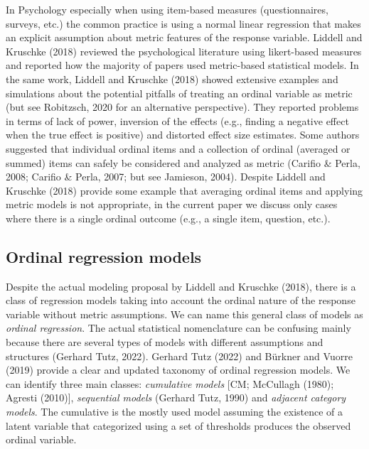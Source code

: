 \documentclass[
  man,floatsintext]{apa6}
\begin{document}
In Psychology especially when using item-based measures (questionnaires, surveys, etc.) the common practice is using a normal linear regression that makes an explicit assumption about metric features of the response variable. Liddell and Kruschke (2018) reviewed the psychological literature using likert-based measures and reported how the majority of papers used metric-based statistical models. In the same work, Liddell and Kruschke (2018) showed extensive examples and simulations about the potential pitfalls of treating an ordinal variable as metric (but see Robitzsch, 2020 for an alternative perspective). They reported problems in terms of lack of power, inversion of the effects (e.g., finding a negative effect when the true effect is positive) and distorted effect size estimates. Some authors suggested that individual ordinal items and a collection of ordinal (averaged or summed) items can safely be considered and analyzed as metric (Carifio \& Perla, 2008; Carifio \& Perla, 2007; but see Jamieson, 2004). Despite Liddell and Kruschke (2018) provide some example that averaging ordinal items and applying metric models is not appropriate, in the current paper we discuss only cases where there is a single ordinal outcome (e.g., a single item, question, etc.).

\subsection{Ordinal regression models}\label{ordinal-regression-models}

Despite the actual modeling proposal by Liddell and Kruschke (2018), there is a class of regression models taking into account the ordinal nature of the response variable without metric assumptions. We can name this general class of models as \emph{ordinal regression}. The actual statistical nomenclature can be confusing mainly because there are several types of models with different assumptions and structures (Gerhard Tutz, 2022). Gerhard Tutz (2022) and Bürkner and Vuorre (2019) provide a clear and updated taxonomy of ordinal regression models. We can identify three main classes: \emph{cumulative models} {[}CM; McCullagh (1980); Agresti (2010){]}, \emph{sequential models} (Gerhard Tutz, 1990) and \emph{adjacent category models}. The cumulative is the mostly used model assuming the existence of a latent variable that categorized using a set of thresholds produces the observed ordinal variable.
\end{document}

